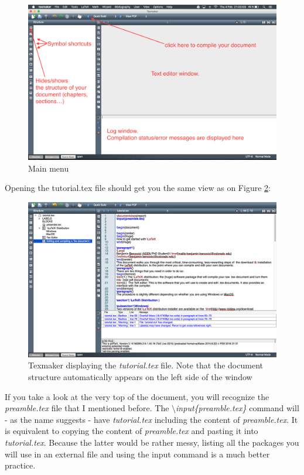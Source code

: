 \begin{figure}[H]
\centering
\includegraphics[scale=0.38]{texmaker_menu}
\caption{Main menu}
\label{fig:texmaker_menu}
\end{figure}

Opening the tutorial.tex file should get you the same view as on Figure \ref{fig:opened_document}:

\begin{figure}[H]
\centering
\includegraphics[scale=0.38]{opened_document}
\caption{Texmaker displaying the \textit{tutorial.tex} file. Note that the document structure automatically appears on the left side of the window}
\label{fig:opened_document}
\end{figure}
If you take a look at the very top of the document, you will recognize the \textit{preamble.tex} file that I mentioned before. The \textit{$\setminus$input\{preamble.tex\}} command will - as the name suggests - have \textit{tutorial.tex} including the content of \textit{preamble.tex}. It is equivalent to copying the content of \textit{preamble.tex} and pasting it into \textit{tutorial.tex}. Because the latter would be rather messy, listing all the packages you will use in an external file and using the input command is a much better practice.\\


